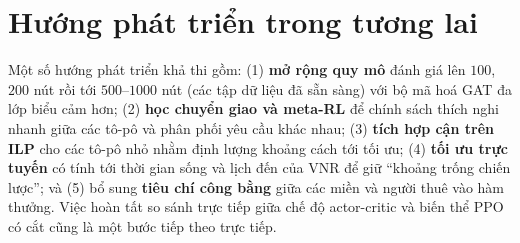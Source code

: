 \documentclass[../DoAn.tex]{subfiles}
\begin{document}
\section*{Hướng phát triển trong tương lai}  %

Một số hướng phát triển khả thi gồm: (1) \textbf{mở rộng quy mô} đánh giá lên $100$, $200$ nút rồi tới $500$–$1000$ nút (các tập dữ liệu đã sẵn sàng) với bộ mã hoá GAT đa lớp biểu cảm hơn; (2) \textbf{học chuyển giao và meta-RL} để chính sách thích nghi nhanh giữa các tô-pô và phân phối yêu cầu khác nhau; (3) \textbf{tích hợp cận trên ILP} cho các tô-pô nhỏ nhằm định lượng khoảng cách tới tối ưu; (4) \textbf{tối ưu trực tuyến} có tính tới thời gian sống và lịch đến của VNR để giữ ``khoảng trống chiến lược''; và (5) bổ sung \textbf{tiêu chí công bằng} giữa các miền và người thuê vào hàm thưởng. Việc hoàn tất so sánh trực tiếp giữa chế độ actor-critic và biến thể PPO có cắt cũng là một bước tiếp theo trực tiếp.
\end{document}
